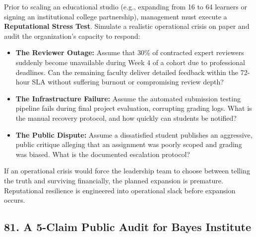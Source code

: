 Prior to scaling an educational studio (e.g., expanding from 16 to 64 learners or signing an institutional college partnership), management must execute a \textbf{Reputational Stress Test}. Simulate a realistic operational crisis on paper and audit the organization's capacity to respond:
\begin{itemize}
\item \textbf{The Reviewer Outage:} Assume that 30\% of contracted expert reviewers suddenly become unavailable during Week 4 of a cohort due to professional deadlines. Can the remaining faculty deliver detailed feedback within the 72-hour SLA without suffering burnout or compromising review depth?
\item \textbf{The Infrastructure Failure:} Assume the automated submission testing pipeline fails during final project evaluation, corrupting grading logs. What is the manual recovery protocol, and how quickly can students be notified?
\item \textbf{The Public Dispute:} Assume a dissatisfied student publishes an aggressive, public critique alleging that an assignment was poorly scoped and grading was biased. What is the documented escalation protocol?
\end{itemize}

If an operational crisis would force the leadership team to choose between telling the truth and surviving financially, the planned expansion is premature. Reputational resilience is engineered into operational slack before expansion occurs.

\subsection*{81. A 5-Claim Public Audit for Bayes Institute}

